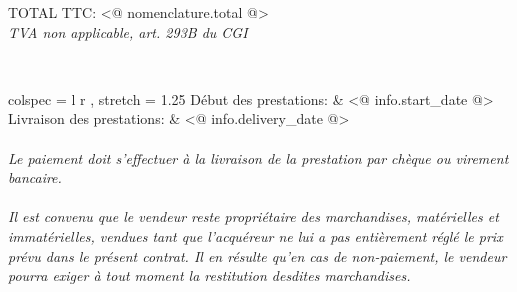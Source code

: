 \documentclass[10pt,a4paper]{article}
\begin{document}
    \begin{flushright}

        \large{TOTAL TTC: <@ nomenclature.total @>} \\
        \textcolor{gray!80}{\small{\em{TVA non applicable, art. 293B du CGI}}}  \\

    \end{flushright}

    \,\\ %
    \begin{tblr}{
        colspec      = { l r },
        stretch      = 1.25
    }
        Début des prestations:     & <@ info.start_date @>    \\
        Livraison des prestations: & <@ info.delivery_date @> \\
    \end{tblr}

    \vspace*{\fill}

    \paragraph{}
    \emph{
        Le paiement doit s’effectuer à la livraison de la prestation par chèque ou virement bancaire. \\
    }

    \paragraph{}
    \emph{
        Il est convenu que le vendeur reste propriétaire des marchandises, matérielles et immatérielles, vendues tant que l’acquéreur ne lui a pas entièrement réglé le prix prévu dans le présent contrat.
        Il en résulte qu’en cas de non-paiement, le vendeur pourra exiger à tout moment la restitution desdites marchandises.
    }
\end{document}
